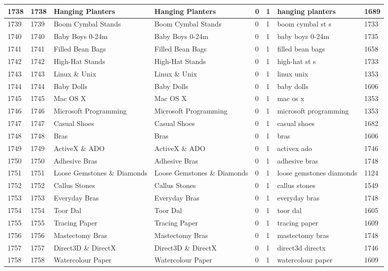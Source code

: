\begin{longtable}{|l|l|l|l|l|l|l|l|}
1738 & 1738 & Hanging Planters & Hanging Planters & 0 & 1 & hanging planters & 1689 \\ \hline 
1739 & 1739 & Boom Cymbal Stands & Boom Cymbal Stands & 0 & 1 & boom cymbal st s & 1733 \\ \hline 
1740 & 1740 & Baby Boys 0-24m & Baby Boys 0-24m & 0 & 1 & baby boys 0-24m & 1735 \\ \hline 
1741 & 1741 & Filled Bean Bags & Filled Bean Bags & 0 & 1 & filled bean bags & 1658 \\ \hline 
1742 & 1742 & High-Hat Stands & High-Hat Stands & 0 & 1 & high-hat st s & 1733 \\ \hline 
1743 & 1743 & Linux \& Unix & Linux \& Unix & 0 & 1 & linux unix & 1353 \\ \hline 
1744 & 1744 & Baby Dolls & Baby Dolls & 0 & 1 & baby dolls & 1606 \\ \hline 
1745 & 1745 & Mac OS X & Mac OS X & 0 & 1 & mac os x & 1353 \\ \hline 
1746 & 1746 & Microsoft Programming & Microsoft Programming & 0 & 1 & microsoft programming & 1353 \\ \hline 
1747 & 1747 & Casual Shoes & Casual Shoes & 0 & 1 & casual shoes & 1682 \\ \hline 
1748 & 1748 & Bras & Bras & 0 & 1 & bras & 1606 \\ \hline 
1749 & 1749 & ActiveX \& ADO & ActiveX \& ADO & 0 & 1 & activex ado & 1746 \\ \hline 
1750 & 1750 & Adhesive Bras & Adhesive Bras & 0 & 1 & adhesive bras & 1748 \\ \hline 
1751 & 1751 & Loose Gemstones \& Diamonds & Loose Gemstones \& Diamonds & 0 & 1 & loose gemstones diamonds & 1124 \\ \hline 
1752 & 1752 & Callus Stones & Callus Stones & 0 & 1 & callus stones & 1549 \\ \hline 
1753 & 1753 & Everyday Bras & Everyday Bras & 0 & 1 & everyday bras & 1748 \\ \hline 
1754 & 1754 & Toor Dal & Toor Dal & 0 & 1 & toor dal & 1605 \\ \hline 
1755 & 1755 & Tracing Paper & Tracing Paper & 0 & 1 & tracing paper & 1609 \\ \hline 
1756 & 1756 & Mastectomy Bras & Mastectomy Bras & 0 & 1 & mastectomy bras & 1748 \\ \hline 
1757 & 1757 & Direct3D \& DirectX & Direct3D \& DirectX & 0 & 1 & direct3d directx & 1746 \\ \hline 
1758 & 1758 & Watercolour Paper & Watercolour Paper & 0 & 1 & watercolour paper & 1609 \\ \hline 

\end{longtable}
